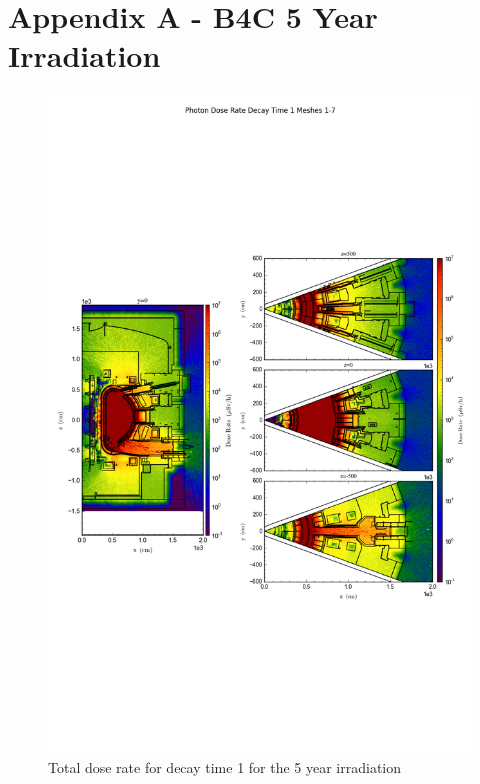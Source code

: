 \documentclass[12pt]{article}
\begin{document}
\section{Appendix A - B4C 5 Year Irradiation}
\begin{figure}[ht!]
\centering
\includegraphics[trim={0cm 8cm, 0cm 8cm},clip,scale=0.75]{../plots/final_model_with_b4c/5year/Photon_Dose_Rate_Decay_Time_1_Meshes_1-7.png}
\caption{Total dose rate for decay time 1 for the 5 year irradiation}
\label{fig:photons_5y_dc1_nob4c_dose}
\end{figure}
\end{document}
